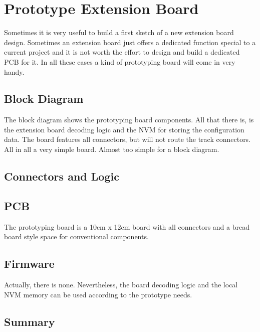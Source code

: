 \chapter{Prototype Extension Board}

Sometimes it is very useful to build a first sketch of a new extension board design. Sometimes an extension board just offers a dedicated function special to a current project and it is not worth the effort to design and build a dedicated PCB for it. In all these cases a kind of prototyping board will come in very handy.

\section{Block Diagram}

The block diagram shows the prototyping board components. All that there is, is the extension board decoding logic and the NVM for storing the configuration data. The board features all connectors, but will not route the track connectors. All in all a very simple board. Almost too simple for a block diagram.


\section{Connectors and Logic}


\section{PCB}

The prototyping board is a 10cm x 12cm board with all connectors and a bread board style space for conventional components.


\section{Firmware}

Actually, there is none. Nevertheless, the board decoding logic and the local NVM memory can be used according to the prototype needs.

\section{Summary}


